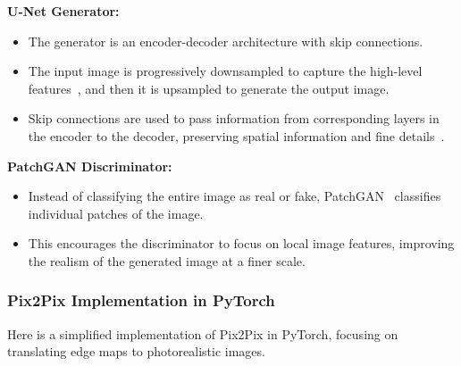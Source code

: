 \textbf{U-Net Generator:}
\begin{itemize}
    \item The generator is an encoder-decoder architecture with skip connections.
    \item The input image is progressively downsampled to capture the high-level features~\cite{ronneberger2015u}, and then it is upsampled to generate the output image.
    \item Skip connections are used to pass information from corresponding layers in the encoder to the decoder, preserving spatial information and fine details~\cite{peng2023u}.
\end{itemize}

\textbf{PatchGAN Discriminator:}
\begin{itemize}
    \item Instead of classifying the entire image as real or fake, PatchGAN~\cite{isola2017image} classifies individual patches of the image.
    \item This encourages the discriminator to focus on local image features, improving the realism of the generated image at a finer scale.
\end{itemize}

\subsubsection{Pix2Pix Implementation in PyTorch}
Here is a simplified implementation of Pix2Pix in PyTorch, focusing on translating edge maps to photorealistic images.

